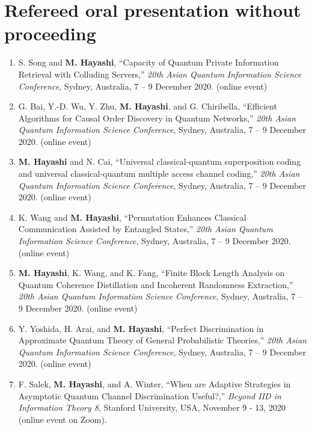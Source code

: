 \documentclass[a4paper,12pt,oneside]{article}
\begin{document}
\section{Refereed oral presentation without proceeding}
\begin{enumerate}

\item
S. Song and \textbf{M. Hayashi},
``Capacity of Quantum Private Information Retrieval with Colluding Servers,''
{\em 20th Asian Quantum Information Science Conference},
Sydney, Australia, 7 -- 9 December 2020. (online event)

\item
G. Bai, Y.-D. Wu, Y. Zhu, \textbf{M. Hayashi}, and G. Chiribella,
``Efficient Algorithms for Causal Order Discovery in Quantum Networks,''
{\em 20th Asian Quantum Information Science Conference},
Sydney, Australia, 7 -- 9 December 2020. (online event)

\item
\textbf{M. Hayashi} and N. Cai,
``Universal classical-quantum superposition coding and universal classical-quantum multiple access channel coding,''
{\em 20th Asian Quantum Information Science Conference},
Sydney, Australia, 7 -- 9 December 2020. (online event)

\item
K. Wang and \textbf{M. Hayashi},
``Permutation Enhances Classical Communication Assisted by Entangled States,''
{\em 20th Asian Quantum Information Science Conference},
Sydney, Australia, 7 -- 9 December 2020. (online event)

\item
\textbf{M. Hayashi}, K. Wang, and K. Fang,
``Finite Block Length Analysis on Quantum Coherence Distillation and Incoherent Randomness Extraction,''
{\em 20th Asian Quantum Information Science Conference},
Sydney, Australia, 7 -- 9 December 2020. (online event)

\item
Y. Yoshida, H. Arai, and \textbf{M. Hayashi},
``Perfect Discrimination in Approximate Quantum Theory of General Probabilistic Theories,''
{\em 20th Asian Quantum Information Science Conference},
Sydney, Australia, 7 -- 9 December 2020. (online event)

\item
F. Salek, \textbf{M. Hayashi}, and A. Winter,
``When are Adaptive Strategies in Asymptotic Quantum Channel Discrimination Useful?,''
{\em Beyond IID in Information Theory 8}, Stanford University, USA, November 9 - 13, 2020 (online event on Zoom).


\end{enumerate}
\end{document}
